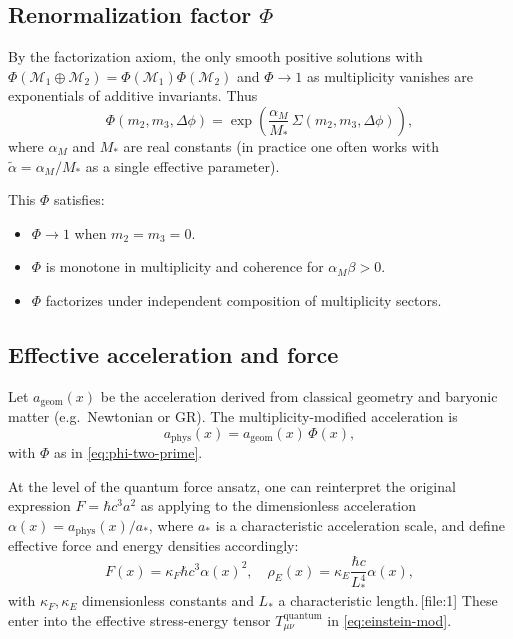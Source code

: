\documentclass[11pt]{article}
\begin{document}
\subsection{Renormalization factor \texorpdfstring{\(\Phi\)}{Phi}}

By the factorization axiom, the only smooth positive solutions with
\(\Phi(\mathcal{M}_1\oplus \mathcal{M}_2)=\Phi(\mathcal{M}_1)\Phi(\mathcal{M}_2)\)
and \(\Phi\to1\) as multiplicity vanishes are exponentials of additive invariants. Thus
\begin{equation}
\Phi(m_2,m_3,\Delta\phi) =
\exp\!\left(\frac{\alpha_M}{M_*}\,\Sigma(m_2,m_3,\Delta\phi)\right),
\label{eq:phi-two-prime}
\end{equation}
where \(\alpha_M\) and \(M_*\) are real constants (in practice one often works with \(\tilde\alpha = \alpha_M/M_*\) as a single effective parameter).

This \(\Phi\) satisfies:
\begin{itemize}
\item \(\Phi\to1\) when \(m_2=m_3=0\).
\item \(\Phi\) is monotone in multiplicity and coherence for \(\alpha_M \beta>0\).
\item \(\Phi\) factorizes under independent composition of multiplicity sectors.
\end{itemize}

\subsection{Effective acceleration and force}

Let \(a_{\mathrm{geom}}(x)\) be the acceleration derived from classical geometry and baryonic matter (e.g.\ Newtonian or GR). The multiplicity-modified acceleration is
\begin{equation}
a_{\mathrm{phys}}(x) = a_{\mathrm{geom}}(x)\,\Phi(x),
\label{eq:accel-phys}
\end{equation}
with \(\Phi\) as in \eqref{eq:phi-two-prime}.

At the level of the quantum force ansatz, one can reinterpret the original expression \(F = \hbar c^3 a^2\) as applying to the dimensionless acceleration \(\alpha(x) = a_{\mathrm{phys}}(x)/a_*\), where \(a_*\) is a characteristic acceleration scale, and define effective force and energy densities accordingly:
\[
F(x) = \kappa_F \hbar c^3 \alpha(x)^2,\quad
\rho_E(x) = \kappa_E \frac{\hbar c}{L_*^4}\alpha(x),
\]
with \(\kappa_F,\kappa_E\) dimensionless constants and \(L_*\) a characteristic length.\,[file:1] These enter into the effective stress-energy tensor \(T_{\mu\nu}^{\mathrm{quantum}}\) in \eqref{eq:einstein-mod}.
\end{document}
